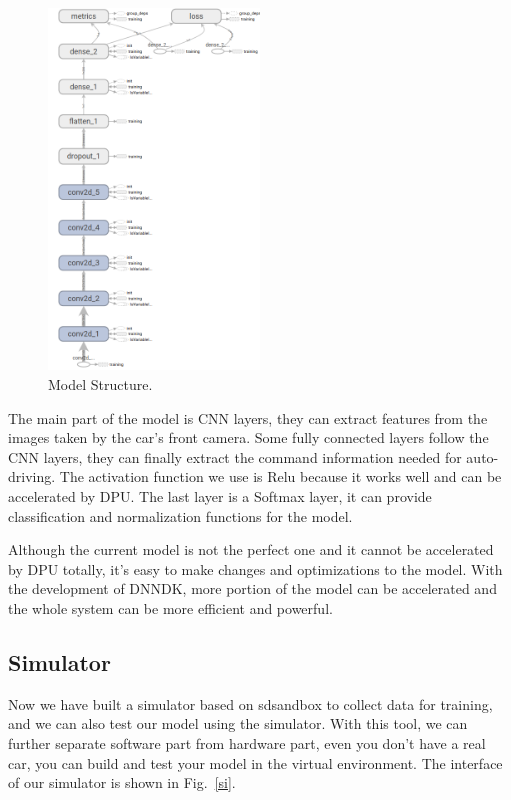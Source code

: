 \documentclass[conference]{IEEEtran}
\begin{document}
\begin{figure}[htbp]
\centerline{\includegraphics[width=0.5\textwidth,height=0.5\textheight]{net-structure.png}}
\caption{Model Structure.}
\label{ms}
\end{figure}

The main part of the model is CNN layers, they can extract features from the images taken by the car's front camera. Some fully connected layers follow the CNN layers, they can finally extract the command information needed for auto-driving. The activation function we use is Relu because it works well and can be accelerated by DPU. The last layer is a Softmax layer, it can provide classification and normalization functions for the model.  

Although the current model is not the perfect one and it cannot be accelerated by DPU totally, it's easy to make changes and optimizations to the model. With the development of DNNDK, more portion of the model can be accelerated and the whole system can be more efficient and powerful.

\subsection{Simulator}

Now we have built a simulator based on sdsandbox\cite{b13} to collect data for training, and we can also test our model using the simulator. With this tool, we can further separate software part from hardware part, even you don't have a real car, you can build and test your model in the virtual environment. The interface of our simulator is shown in Fig.~\ref{si}.  
\end{document}
